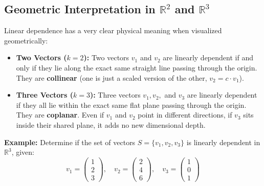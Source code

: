 \documentclass[11pt, a4paper]{article}
\begin{document}
	\subsection*{Geometric Interpretation in $\mathbb{R}^2$ and $\mathbb{R}^3$}
	Linear dependence has a very clear physical meaning when visualized geometrically:
	\begin{itemize}
		\item \textbf{Two Vectors ($k = 2$):} Two vectors $v_1$ and $v_2$ are linearly dependent if and only if they lie along the exact same straight line passing through the origin. They are \textbf{collinear} (one is just a scaled version of the other, $v_2 = c \cdot v_1$).
		\item \textbf{Three Vectors ($k = 3$):} Three vectors $v_1, v_2,$ and $v_3$ are linearly dependent if they all lie within the exact same flat plane passing through the origin. They are \textbf{coplanar}. Even if $v_1$ and $v_2$ point in different directions, if $v_3$ sits inside their shared plane, it adds no new dimensional depth.
	\end{itemize}
	
	
	
	\noindent \textbf{Example:} Determine if the set of vectors $S = \{v_1, v_2, v_3\}$ is linearly dependent in $\mathbb{R}^3$, given:
	\[
	v_1 = \begin{pmatrix} 1 \\ 2 \\ 3 \end{pmatrix}, \quad 
	v_2 = \begin{pmatrix} 2 \\ 4 \\ 6 \end{pmatrix}, \quad 
	v_3 = \begin{pmatrix} 1 \\ 0 \\ 1 \end{pmatrix}
	\]
	
\end{document}
